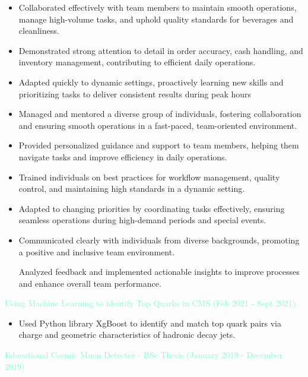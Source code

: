 \documentclass[10pt,a4paper,ragged2e,withhyper]{altacv}
\begin{document}
\begin{paracol}{2}


\begin{itemize}
    \item Collaborated effectively with team members to maintain smooth operations, manage high-volume tasks, and uphold quality standards for beverages and cleanliness.
    \item Demonstrated strong attention to detail in order accuracy, cash handling, and inventory management, contributing to efficient daily operations.
    \item Adapted quickly to dynamic settings, proactively learning new skills and prioritizing tasks to deliver consistent results during peak hours
\end{itemize}
\begin{itemize}
    \item  Managed and mentored a diverse group of individuals, fostering collaboration and ensuring smooth operations in a fast-paced, team-oriented environment.

    \item  Provided personalized guidance and support to team members, helping them navigate tasks and improve efficiency in daily operations.

    \item  Trained individuals on best practices for workflow management, quality control, and maintaining high standards in a dynamic setting.

    \item  Adapted to changing priorities by coordinating tasks effectively, ensuring seamless operations during high-demand periods and special events.

    \item  Communicated clearly with individuals from diverse backgrounds, promoting a positive and inclusive team environment.

    Analyzed feedback and implemented actionable insights to improve processes and enhance overall team performance.
\end{itemize}

\textcolor{Aquamarine}{Using Machine Learning to identify Top Quarks in CMS (Feb 2021 - Sept 2021)}
\begin{itemize}
    \item Used Python library XgBoost to identify and match top quark pairs via charge and geometric characteristics of  hadronic decay jets.
\end{itemize}
\textcolor{Aquamarine}{Educational Cosmic Muon Detector - BSc Thesis (January 2019 - December 2019)}
\switchcolumn


\end{paracol}
\end{document}
